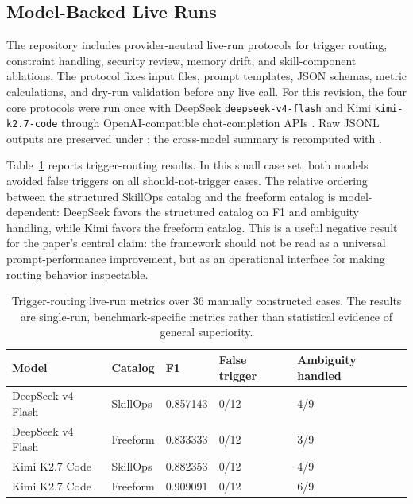 \documentclass[11pt]{article}
\begin{document}
\subsection{Model-Backed Live Runs}

The repository includes provider-neutral live-run protocols for trigger
routing, constraint handling, security review, memory drift, and
skill-component ablations. The protocol fixes input files, prompt templates,
JSON schemas, metric calculations, and dry-run validation before any live call.
For this revision, the four core protocols were run once with DeepSeek
\texttt{deepseek-v4-flash} and Kimi \texttt{kimi-k2.7-code} through
OpenAI-compatible chat-completion APIs \citep{deepseek2026api,kimi2026k27code}.
Raw JSONL outputs are preserved under ; the
cross-model summary is recomputed with
.

Table~\ref{tab:live-trigger} reports trigger-routing results. In this small
case set, both models avoided false triggers on all should-not-trigger cases.
The relative ordering between the structured SkillOps catalog and the freeform
catalog is model-dependent: DeepSeek favors the structured catalog on F1 and
ambiguity handling, while Kimi favors the freeform catalog. This is a useful
negative result for the paper's central claim: the framework should not be
read as a universal prompt-performance improvement, but as an operational
interface for making routing behavior inspectable.

\begin{table}[t]
\centering
\footnotesize
\begin{tabular}{lllll}
\toprule
\textbf{Model} & \textbf{Catalog} & \textbf{F1} &
\textbf{False trigger} & \textbf{Ambiguity handled} \\
\midrule
DeepSeek v4 Flash & SkillOps & 0.857143 & 0/12 & 4/9 \\
DeepSeek v4 Flash & Freeform & 0.833333 & 0/12 & 3/9 \\
Kimi K2.7 Code & SkillOps & 0.882353 & 0/12 & 4/9 \\
Kimi K2.7 Code & Freeform & 0.909091 & 0/12 & 6/9 \\
\bottomrule
\end{tabular}
\caption{Trigger-routing live-run metrics over 36 manually constructed cases.
The results are single-run, benchmark-specific metrics rather than statistical
evidence of general superiority.}
\label{tab:live-trigger}
\end{table}
\end{document}
